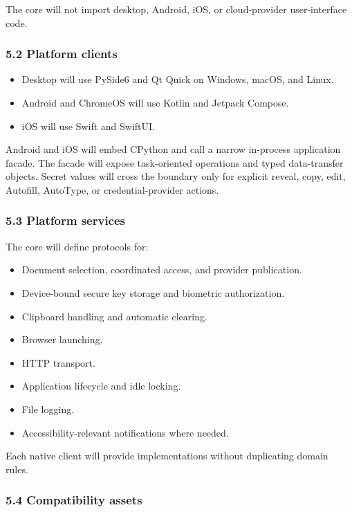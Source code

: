 \documentclass[
  letterpaper,
]{article}
\providecommand{\tightlist}{%
  \setlength{\itemsep}{0pt}\setlength{\parskip}{0pt}}
\begin{document}
The core will not import desktop, Android, iOS, or cloud-provider user-interface code.

\subsubsection{5.2 Platform clients}\label{52-platform-clients}

\begin{itemize}
\tightlist
\item
  Desktop will use PySide6 and Qt Quick on Windows, macOS, and Linux.
\item
  Android and ChromeOS will use Kotlin and Jetpack Compose.
\item
  iOS will use Swift and SwiftUI.
\end{itemize}

Android and iOS will embed CPython and call a narrow in-process application facade. The facade will expose task-oriented
operations and typed data-transfer objects. Secret values will cross the boundary only for explicit reveal, copy, edit,
Autofill, AutoType, or credential-provider actions.

\subsubsection{5.3 Platform services}\label{53-platform-services}

The core will define protocols for:

\begin{itemize}
\tightlist
\item
  Document selection, coordinated access, and provider publication.
\item
  Device-bound secure key storage and biometric authorization.
\item
  Clipboard handling and automatic clearing.
\item
  Browser launching.
\item
  HTTP transport.
\item
  Application lifecycle and idle locking.
\item
  File logging.
\item
  Accessibility-relevant notifications where needed.
\end{itemize}

Each native client will provide implementations without duplicating domain rules.

\subsubsection{5.4 Compatibility assets}\label{54-compatibility-assets}
\end{document}

